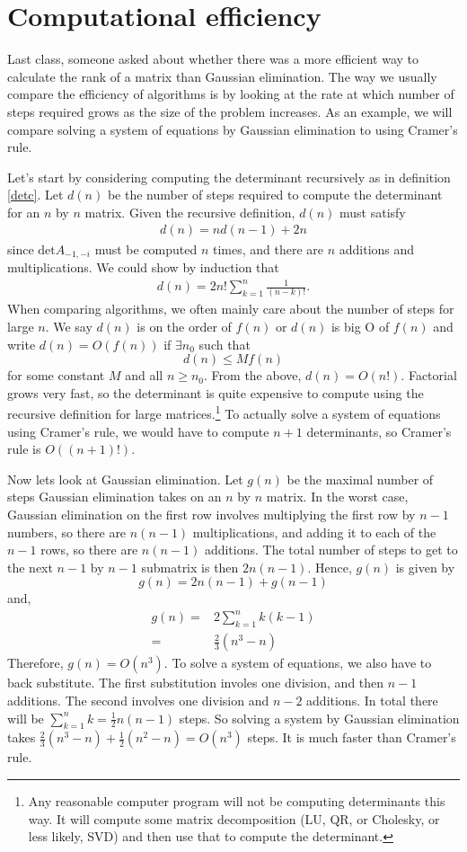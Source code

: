 \documentclass[12pt,reqno]{amsart}
\renewcommand{\det}{\mathrm{det}}
\theoremstyle{definition}
\begin{document}
\section{Computational efficiency}
Last class, someone asked about whether there was a more efficient way
to calculate the rank of a matrix than Gaussian elimination. The way
we usually compare the efficiency of algorithms is by looking at the
rate at which number of steps required grows as the size of the
problem increases. As an example, we will compare solving a system of
equations by Gaussian elimination to using Cramer's rule.

Let's start by considering computing the determinant
recursively as in definition \ref{detc}. Let $d(n)$ be the number of
steps required to compute the determinant for an $n$ by $n$
matrix. Given the recursive definition, $d(n)$ must satisfy
\begin{align*}
  d(n) = n d(n-1) + 2n 
\end{align*}
since $\det A_{-1,-i}$ must be computed $n$ times, and there are $n$
additions and multiplications. We could show by induction that
\begin{align*}
  d(n) = 2n! \sum_{k=1}^n \frac{1}{(n-k)!} .
\end{align*}
When comparing algorithms, we often mainly care about the number of
steps for large $n$. We say $d(n)$ is on the order of $f(n)$ or $d(n)$
is big O of $f(n)$ and write $d(n) = O(f(n))$ if $\exists n_0$ such
that
\[
  d(n) \leq M f(n) 
\]
for some constant $M$ and all $n \geq n_0$. From the above, $d(n) =
O(n!)$. Factorial grows very fast, so the determinant is quite
expensive to compute using the recursive definition for large
matrices.\footnote{Any reasonable computer program will not be
  computing determinants this way. It will compute some matrix
  decomposition (LU, QR, or Cholesky, or less likely, SVD) and then
  use that to compute the determinant.} To actually solve a system of
equations using Cramer's rule, we would have to compute $n+1$
determinants, so Cramer's rule is $O((n+1)!)$.

Now lets look at Gaussian elimination. Let $g(n)$ be the maximal
number of steps Gaussian elimination takes on an $n$ by $n$ matrix. In
the worst case, Gaussian elimination on the first row involves multiplying
the first row by $n-1$ numbers, so there are $n(n-1)$ multiplications,
and adding it to each of the $n-1$ rows, so there are $n(n-1)$
additions. The total number of steps to get to the next $n-1$ by $n-1$
submatrix is then $2n(n-1)$. Hence, $g(n)$ is given by
\[ g(n) = 2n(n-1) + g(n-1) \]
and,
\begin{align*}
  g(n) = & 2 \sum_{k=1}^n k(k-1) \\
  = & \frac{2}{3} (n^3 - n)
\end{align*}
Therefore, $g(n) = O(n^3)$. To solve a system of equations, we also
have to back substitute. The first substitution involes one division,
and then $n-1$ additions. The second involves one division and $n-2$
additions. In total there will be $\sum_{k=1}^n k = \frac{1}{2}
n(n-1)$ steps. So solving a system by Gaussian elimination takes 
$\frac{2}{3} (n^3 - n) + \frac{1}{2}(n^2 - n) = O(n^3)$ steps. It is
much faster than Cramer's rule. 
\end{document}
